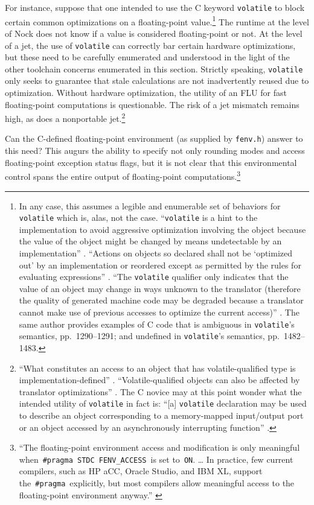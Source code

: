 \documentclass[twoside]{article}
\begin{document}
For instance, suppose that one intended to use the C keyword \texttt{volatile} to block certain common optimizations on a floating-point value.\footnote{In any case, this assumes a legible and enumerable set of behaviors for \texttt{volatile} which is, alas, not the case.  “\texttt{volatile} is a hint to the implementation to avoid aggressive optimization involving the object because the value of the object might be changed by means undetectable by an implementation” \citep[p.~472]{Jones2008}.  “Actions on objects so declared shall not be ‘optimized out’ by an implementation or reordered except as permitted by the rules for evaluating expressions” \citep[p.~1500]{Jones2008}.  “The \texttt{volatile} qualifier only indicates that the value of an object may change in ways unknown to the translator (therefore the quality of generated machine code may be degraded because a translator cannot make use of previous accesses to optimize the current access)” \citep[p.~963]{Jones2008}.  The same author provides examples of C code that is ambiguous in \texttt{volatile}'s semantics, pp.~1290–1291; and undefined in \texttt{volatile}'s semantics, pp.~1482–1483.}  The runtime at the level of Nock does not know if a value is considered floating-point or not.  At the level of a jet, the use of \texttt{volatile} can correctly bar certain hardware optimizations, but these need to be carefully enumerated and understood in the light of the other toolchain concerns enumerated in this section.  Strictly speaking, \texttt{volatile} only seeks to guarantee that stale calculations are not inadvertently reused due to optimization.  Without hardware optimization, the utility of an FLU for fast floating-point computations is questionable.  The risk of a jet mismatch remains high, as does a nonportable jet.\footnote{“What constitutes an access to an object that has volatile-qualified type is implementation-defined” \citep[p.~1488]{Jones2008}.  “Volatile-qualified objects can also be affected by translator optimizations” \citep[p.~1490]{Jones2008}.  The C novice may at this point wonder what the intended utility of \texttt{volatile} in fact is:  “[a] \texttt{volatile} declaration may be used to describe an object corresponding to a memory-mapped input/output port or an object accessed by an asynchronously interrupting function” \citep[p.~1499]{Jones2008}.}

Can the C-defined floating-point environment (as supplied by \texttt{fenv.h}) answer to this need?  This augurs the ability to specify not only rounding modes and access floating-point exception status flags, but it is not clear that this environmental control spans the entire output of floating-point computations.\footnote{“The floating-point environment access and modification is only meaningful when \texttt{\#pragma STDC FENV\_ACCESS} is set to \texttt{ON}.  \ldots{} In practice, few current compilers, such as HP aCC, Oracle Studio, and IBM XL, support the \texttt{\#pragma} explicitly, but most compilers allow meaningful access to the floating-point environment anyway.” \citep{CPPRef}}
\end{document}

